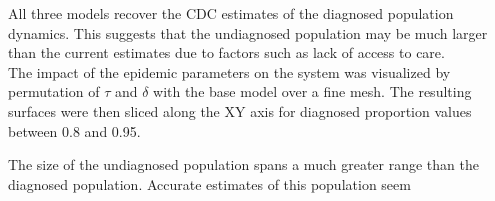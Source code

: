 \documentclass[final]{beamer}
\newlength{\sepwid}
\newlength{\onecolwid}
\newlength{\twocolwid}
\newlength{\threecolwid}
\begin{document}
\begin{frame}[t]
\begin{columns}[t]
\begin{column}{\threecolwid}
\begin{column}{\twocolwid}
\begin{column}{\twocolwid}
\begin{column}{\onecolwid}
All three models recover the CDC estimates of the diagnosed population dynamics. This suggests that the undiagnosed population may be much larger than the current estimates due to factors such as lack of access to care.\\ 
The impact of the epidemic parameters on the system was visualized by permutation of $\tau$ and $\delta$ with the base model over a fine mesh.
The resulting surfaces were then sliced along the XY axis for diagnosed proportion values between 0.8 and 0.95. \\%
\begin{table}    
\begin{centering}
\end{centering}
\end{table}
The size of the undiagnosed population spans a much greater range than the diagnosed population. Accurate estimates of this population seem 
\end{column}
  \begin{column}{\sepwid}\end{column}		
  \begin{column}{\onecolwid}


 

\end{column}
\end{column}
\end{column}
\end{column}
\end{columns}
\end{frame}
\end{document}
